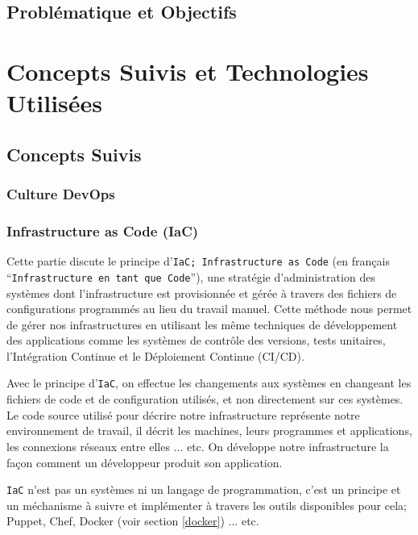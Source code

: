 \documentclass[a4paper,11pt,oneside]{report}
\begin{document}
\section{Problématique et Objectifs}

\newpage

\chapter{Concepts Suivis et Technologies Utilisées}

\newpage

\section{Concepts Suivis}

\subsection{Culture DevOps}

\subsection{Infrastructure as Code (IaC)}
Cette partie discute le principe d'\texttt{IaC; Infrastructure as Code}\cite[Chapter~4]{thePracticeOfSystemAndNetworkAdministration} (en français ``\texttt{Infrastructure en tant que Code}''), une stratégie d'administration des systèmes dont l'infrastructure est provisionnée et gérée à travers des fichiers de configurations programmés au lieu du travail manuel. Cette méthode nous permet de gérer nos infrastructures en utilisant les même techniques de développement des applications comme les systèmes de contrôle des versions, tests unitaires, l'Intégration Continue et le Déploiement Continue (CI/CD). 
\newline

Avec le principe d'\texttt{IaC}, on effectue les changements aux systèmes en changeant les fichiers de code et de configuration utilisés, et non directement sur ces systèmes. Le code source utilisé pour décrire notre infrastructure représente notre environnement de travail, il décrit les machines, leurs programmes et applications, les connexions réseaux entre elles ... etc. On développe notre infrastructure la façon comment un développeur produit son application.
\newline

\texttt{IaC} n'est pas un systèmes ni un langage de programmation, c'est un principe et un méchanisme à suivre et implémenter à travers les outils disponibles pour cela; Puppet\cite{puppetWiki}, Chef\cite{chefWiki}, Docker (voir section \ref{docker}) ... etc.
\end{document}
